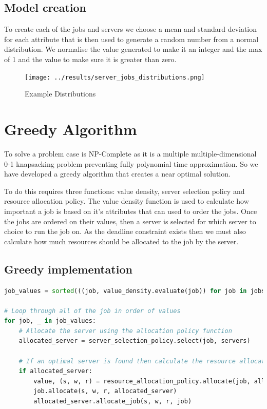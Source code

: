 \documentclass[fleqn]{article}
\begin{document}
\subsection{Model creation}\label{subsec:model-creation}
To create each of the jobs and servers we choose a mean and standard deviation for each attribute that is then used to generate a random number from a normal distribution.
We normalise the value generated to make it an integer and the max of 1 and the value to make sure it is greater than zero.
\begin{figure}[H]
    \centering
    \texttt{[image: ../results/server\_jobs\_distributions.png]}
    \caption{Example Distributions}
\end{figure}

\section{Greedy Algorithm}\label{sec:greedy-algorithm}
To solve a problem case is NP-Complete as it is a multiple multiple-dimensional 0-1 knapsacking problem preventing fully polynomial time approximation.
So we have developed a greedy algorithm that creates a near optimal solution.

To do this requires three functions: value density, server selection policy and resource allocation policy.
The value density function is used to calculate how important a job is based on it's attributes that can used to order the jobs.
Once the jobs are ordered on their values, then a server is selected for which server to choice to run the job on.
As the deadline constraint exists then we must also calculate how much resources should be allocated to the job by the server.

\subsection{Greedy implementation}\label{subsec:greedy-implementation}
\begin{lstlisting}[language=Python]
job_values = sorted(((job, value_density.evaluate(job)) for job in jobs), key=lambda jv: jv[1], reverse=True)

# Loop through all of the job in order of values
for job, _ in job_values:
    # Allocate the server using the allocation policy function
    allocated_server = server_selection_policy.select(job, servers)

    # If an optimal server is found then calculate the resource allocation policy
    if allocated_server:
        value, (s, w, r) = resource_allocation_policy.allocate(job, allocated_server)
        job.allocate(s, w, r, allocated_server)
        allocated_server.allocate_job(s, w, r, job)
\end{lstlisting}
\end{document}
